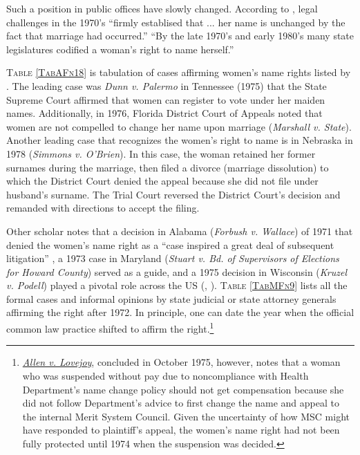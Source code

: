 Such a position in public offices have slowly changed. According to \citet[][p.6]{Augustine1997}, legal challenges in the 1970's ``firmly establised that ... her name is unchanged by the fact that marriage had occurred.'' ``By the late 1970's and early 1980's many state legislatures codified a woman's right to name herself.'' 

\textsc{Table \ref{TabAFn18}} is tabulation of cases affirming women's name rights listed by \citet[][fn. 18]{Augustine1997}. The leading case was \textit{Dunn v. Palermo} in Tennessee (1975) that the State Supreme Court affirmed that women can register to vote under her maiden names. Additionally, in 1976, Florida District Court of Appeals noted that women are not compelled to change her name upon marriage (\textit{Marshall v. State}). Another leading case that recognizes the women's right to name is in Nebraska in 1978 (\textit{Simmons v. O'Brien}). In this case, the woman retained her former surnames during the marriage, then filed a divorce (marriage dissolution) to which the District Court denied the appeal because she did not file under husband's surname. The Trial Court reversed the District Court's decision and remanded with directions to accept the filing.

Other scholar notes that a decision in Alabama (\textit{Forbush v. Wallace}) of 1971 that denied the women's name right as a ``case inspired a great deal of subsequent litigation'' \citep[][299]{MacClintock2010}, a 1973 case in Maryland (\textit{Stuart v. Bd. of Supervisors of Elections for Howard County}) served as a guide, and a 1975 decision in Wisconsin (\textit{Kruzel v. Podell}) played a pivotal role across the US (\cite[][fn 4]{MacDougall1985}, \cite[][300]{MacClintock2010}). \textsc{Table \ref{TabMFn9}} lists all the formal cases and informal opinions by state judicial or state attorney generals affirming the right after 1972. In principle, one can date the year when the official common law practice shifted to affirm the right.\footnote{\href{https://law.justia.com/cases/federal/district-courts/FSupp/406/359/2143469/}{\textit{Allen v. Lovejoy}}, concluded in October 1975, however, notes that a woman who was suspended without pay due to noncompliance with Health Department's name change policy should not get compensation because she did not follow Department's advice to first change the name and appeal to the internal Merit System Council. Given the uncertainty of how MSC might have responded to plaintiff's appeal, the women's name right had not been fully protected until 1974 when the suspension was decided. } 

